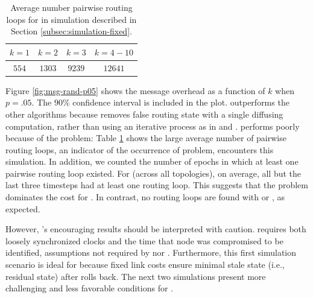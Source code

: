 \begin{table}
\begin{center}
\begin{tabular}{|c|c|c|c|}
\hline
  $k=1$ & $k=2$ & $k=3$ & $k=4-10$ \\
\hline
  $554$ & $1303$ & $9239$ &  $12641$ \\
\hline
\end{tabular}
\end{center}
\caption{Average number pairwise routing loops for \second in simulation described in Section \ref{subsec:simulation-fixed}.} 
\label{tab:loop1}
\end{table}


Figure \ref{fig:msg-rand-p05} shows the message overhead as a function of $k$ when $p=.05$. The $90 \%$ confidence interval is included in the plot.
\cpr outperforms the other algorithms because \cpr removes false routing state with a single diffusing computation, rather than using an iterative process as in \second and \purges. 
\second performs poorly because of the \infinity problem: 
Table \ref{tab:loop1} shows the large average number of pairwise routing loops, an indicator of the occurrence of \infinity problem, \second encounters this simulation.
In addition, we counted the number of epochs in which at least one pairwise routing loop existed.  For \second (across all topologies), on average, all but the last three 
timesteps had at least one routing loop.  This suggests that the \infinity problem dominates the cost for \seconds. 
In contrast, no routing loops are found with \purge or \cprs, as expected.


However, \cprs's encouraging results should be interpreted with caution.
\cpr requires both loosely synchronized clocks and the time that node \bad was compromised to be identified, assumptions not required by \second nor \purges.  
Furthermore, this first simulation scenario is ideal for \cpr because fixed link costs ensure minimal stale state (i.e., residual \oldvector state)
after \cpr rolls back.  The next two simulations present more challenging and less favorable conditions for \cprs.





